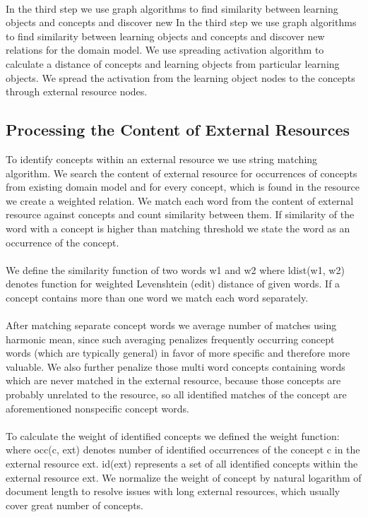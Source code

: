 \documentclass{llncs}
\begin{document}
\\
In the third step we use graph algorithms to find similarity between learning objects and concepts and discover new In the third step we use graph algorithms to find similarity between learning objects and concepts and discover new relations for the domain model. We use spreading activation algorithm to calculate a distance of concepts and learning objects from particular learning objects. We spread the activation from the learning object nodes to the concepts through external resource nodes. 
\subsection{Processing the Content of External Resources }
% 
To identify concepts within an external resource we use string matching algorithm. We search the content of external resource for occurrences of concepts from existing domain model and for every concept, which is found in the resource we create a weighted relation. We match each word from the content of external resource against concepts and count similarity between them. If similarity of the word with a concept is higher than matching threshold we state the word as an occurrence of the concept.\\
\\
We define the similarity function of two words w1 and w2 where ldist(w1, w2) denotes function for weighted Levenshtein (edit) distance of given words. If a concept contains more than one word we match each word separately.\\
\\
After matching separate concept words we average number of matches using harmonic mean, since such averaging penalizes frequently occurring concept words (which are typically general) in favor of more specific and therefore more valuable. We also further penalize those multi word concepts containing words which are never matched in the external resource, because those concepts are probably unrelated to the resource, so all identified matches of the concept are aforementioned nonspecific concept words.\\
\\
To calculate the weight of identified concepts we defined the weight function: where occ(c, ext) denotes number of identified occurrences of the concept c in the external resource ext.  id(ext) represents a set of all identified concepts within the external resource ext. We normalize the weight of concept by natural logarithm of document length to resolve issues with long external resources, which usually cover great number of concepts.\\
\end{document}
